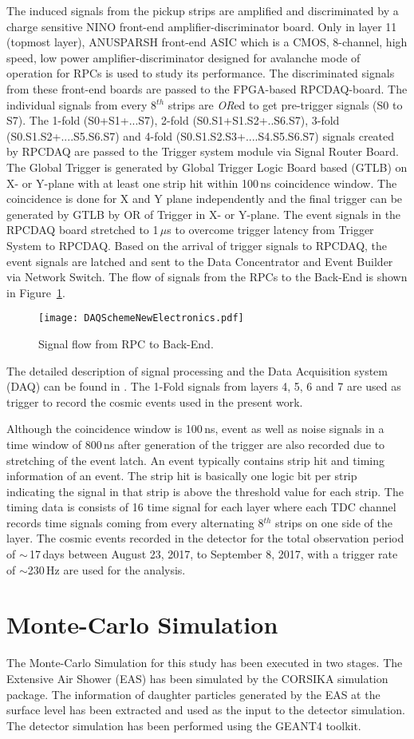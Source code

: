 The induced signals from the pickup strips are amplified and
discriminated by a charge sensitive NINO\cite{nino} front-end
amplifier-discriminator board. Only in layer 11 (topmost layer),
ANUSPARSH front-end ASIC\cite{anusp} which is a CMOS, 8-channel,
high speed, low power amplifier-discriminator designed for
avalanche mode of operation for RPCs is used to study its performance.
The discriminated signals from these front-end boards are passed
to the FPGA-based RPCDAQ-board. The individual signals from every 
8$^{th}$ strips are \emph{OR}ed to get pre-trigger signals (S0 to S7).
The 1-fold (S0+S1+...S7), 2-fold (S0.S1+S1.S2+..S6.S7),
3-fold (S0.S1.S2+....S5.S6.S7) and 4-fold
(S0.S1.S2.S3+....S4.S5.S6.S7) signals created by RPCDAQ are passed
to the Trigger system module via Signal Router Board. The Global
Trigger is generated by Global Trigger Logic Board based (GTLB)
on X- or Y-plane with at least one strip hit within
100\,ns coincidence window. The coincidence is done for X and Y plane
independently and the final trigger can be generated by GTLB by OR
of Trigger in X- or Y-plane. The event signals in the RPCDAQ board
stretched to 1\,$\mu$s to overcome trigger latency from Trigger System
to RPCDAQ. Based on the arrival of trigger signals to RPCDAQ,
the event signals are latched and sent to the Data Concentrator
and Event Builder via Network Switch. The flow of signals from the
RPCs to the Back-End is shown in Figure~\ref{fig:sigflow}.
\begin{figure}[h]
  \texttt{[image: DAQSchemeNewElectronics.pdf]} 
  \caption{Signal flow from RPC to Back-End.}
  \label{fig:sigflow}
\end{figure}
The detailed description of signal processing and the Data Acquisition
system (DAQ) can be found in \cite{elec1}. The 1-Fold signals
from layers 4, 5, 6 and 7 are used as trigger to record the cosmic
events used in the present work.

Although the coincidence window is 100\,ns, event as well as noise
signals in a time window of 800\,ns after generation of the trigger
are also recorded due to stretching of the event latch. An event
typically contains strip hit and timing information of an event.
The strip hit is basically one logic bit per strip indicating
the signal in that strip is above the threshold value for each strip.
The timing data is consists of 16 time signal for each layer where
each TDC channel records time signals coming from every alternating
8$^{th}$ strips on one side of the layer.
The cosmic events recorded in the detector for the total observation
period of $\sim$\,17\,days between August 23, 2017, to September 8,
2017, with a trigger rate of $\sim$230\,Hz are used for the analysis.

\section{Monte-Carlo Simulation} \label{sec:montecarlo}
The Monte-Carlo Simulation for this study has been executed in
two stages. The Extensive Air Shower (EAS) has been simulated
by the CORSIKA simulation package. The information of daughter
particles generated by the EAS at the surface level has been
extracted and used as the input to the detector simulation.
The detector simulation has been performed using the GEANT4 toolkit. 
